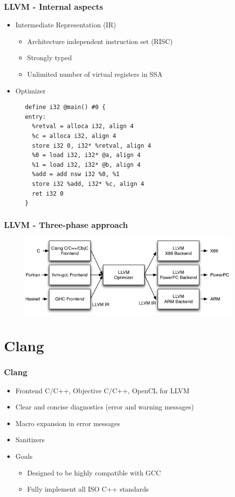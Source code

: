 \documentclass{beamer}
\begin{document}
\begin{frame}[fragile]
\frametitle{LLVM - Internal aspects}
\begin{itemize}
  \item Intermediate Representation (IR)
  \begin{itemize}
    \item Architecture independent instruction set (RISC)
    \item Strongly typed
    \item Unlimited number of virtual registers in SSA
  \end{itemize}
  \item Optimizer
\end{itemize}

\begin{lstlisting}
      define i32 @main() #0 {
      entry:
        %retval = alloca i32, align 4
        %c = alloca i32, align 4
        store i32 0, i32* %retval, align 4
        %0 = load i32, i32* @a, align 4
        %1 = load i32, i32* @b, align 4
        %add = add nsw i32 %0, %1
        store i32 %add, i32* %c, align 4
        ret i32 0
      }
\end{lstlisting}

\end{frame}

\begin{frame}
\frametitle{LLVM - Three-phase approach}
\begin{figure}
\includegraphics[width=0.8\linewidth]{img/llvm_struct.png}
\end{figure}
\end{frame}
\section{Clang}

\begin{frame}
\frametitle{Clang}
\begin{itemize}
  \item Frontend C/C++, Objective C/C++, OpenCL for LLVM
  \item Clear and concise diagnostics (error and warning messages)
  \item Macro expansion in error messages
  \item Sanitizers
  \item Goals
  \begin{itemize}
    \item Designed to be highly compatible with GCC
    \item Fully implement all ISO C++ standards
  \end{itemize}
\end{itemize}
\end{frame}
\end{document}
